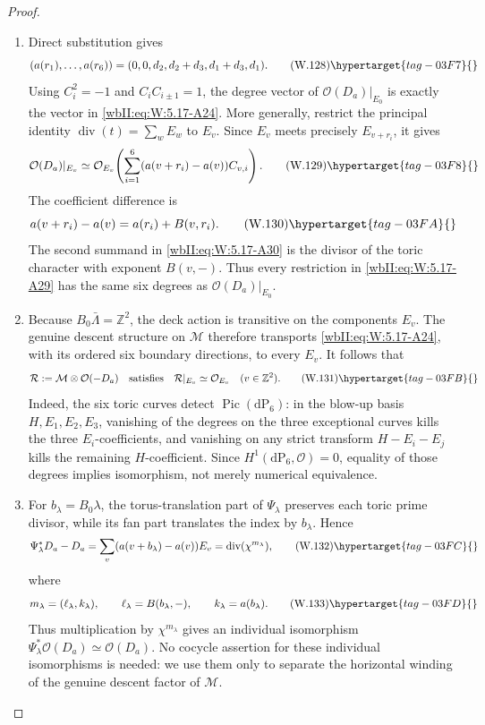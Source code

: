 \begin{proof}
\begin{enumerate}[label={$\langle1\rangle$\arabic*.},leftmargin=*]
\item Direct substitution gives
\[
 (a(r_1),\ldots,a(r_6))
 =(0,0,d_2,d_2+d_3,d_1+d_3,d_1).
\tag{W.128}\hypertarget{tag-03F7}{}\label{wbII:eq:W:5.17-A28}
\]
Using \(C_i^2=-1\) and \(C_iC_{i\pm1}=1\), the degree vector of
\(\mathcal O(D_a)|_{E_0}\) is exactly the vector in \eqref{wbII:eq:W:5.17-A24}.  More
generally, restrict the principal identity
\(\operatorname{div}(t)=\sum_wE_w\) to \(E_v\).  Since \(E_v\) meets
precisely \(E_{v+r_i}\), it gives
\[
 \mathcal O(D_a)|_{E_v}
 \simeq
 \mathcal O_{E_v}\!\left(
   \sum_{i=1}^6(a(v+r_i)-a(v))C_{v,i}
 \right).
\tag{W.129}\hypertarget{tag-03F8}{}\label{wbII:eq:W:5.17-A29}
\]
The coefficient difference is
\[
 a(v+r_i)-a(v)=a(r_i)+B(v,r_i).
\tag{W.130}\hypertarget{tag-03FA}{}\label{wbII:eq:W:5.17-A30}
\]
The second summand in \eqref{wbII:eq:W:5.17-A30} is the divisor of the toric character
with exponent \(B(v,-)\).  Thus every restriction in \eqref{wbII:eq:W:5.17-A29} has the
same six degrees as \(\mathcal O(D_a)|_{E_0}\).

\item Because \(B_0\bar\Lambda=\mathbb Z^2\), the deck action is transitive on
the components \(E_v\).  The genuine descent structure on \(\mathcal M\)
therefore transports \eqref{wbII:eq:W:5.17-A24}, with its ordered six boundary directions,
to every \(E_v\).  It follows that
\[
 \mathcal R:=\mathcal M\otimes\mathcal O(-D_a)
 \quad\text{satisfies}\quad
 \mathcal R|_{E_v}\simeq\mathcal O_{E_v}
 \quad(v\in\mathbb Z^2).
\tag{W.131}\hypertarget{tag-03FB}{}\label{wbII:eq:W:5.17-A31}
\]
Indeed, the six toric curves detect \(\operatorname{Pic}(\mathrm{dP}_6)\):
in the blow-up basis \(H,E_1,E_2,E_3\), vanishing of the degrees on the
three exceptional curves kills the three \(E_i\)-coefficients, and
vanishing on any strict transform \(H-E_i-E_j\) kills the remaining
\(H\)-coefficient.  Since
\(H^1(\mathrm{dP}_6,\mathcal O)=0\), equality of those degrees implies
isomorphism, not merely numerical equivalence.

\item For \(b_\lambda=B_0\lambda\), the torus-translation part of
\(\Psi_\lambda\) preserves each toric prime divisor, while its fan part
translates the index by \(b_\lambda\).  Hence
\[
 \Psi_\lambda^*D_a-D_a
 =\sum_v(a(v+b_\lambda)-a(v))E_v
 =\operatorname{div}(\chi^{m_\lambda}),
\tag{W.132}\hypertarget{tag-03FC}{}\label{wbII:eq:W:5.17-A32}
\]
where
\[
 m_\lambda=(\ell_\lambda,k_\lambda),
 \qquad
 \ell_\lambda=B(b_\lambda,-),
 \qquad
 k_\lambda=a(b_\lambda).
\tag{W.133}\hypertarget{tag-03FD}{}\label{wbII:eq:W:5.17-A33}
\]
Thus multiplication by \(\chi^{m_\lambda}\) gives an individual
isomorphism
\(\Psi_\lambda^*\mathcal O(D_a)\simeq\mathcal O(D_a)\).
No cocycle assertion for these individual isomorphisms is needed: we use
them only to separate the horizontal winding of the genuine descent factor
of \(\mathcal M\).


\end{enumerate}
\end{proof}
